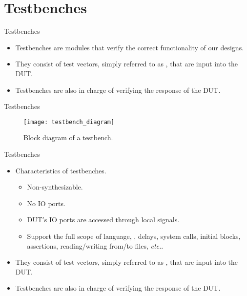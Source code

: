 \section{Testbenches}
%
\begin{frame}{Testbenches}{}
\begin{itemize}
\item Testbenches are  modules that verify the correct functionality of our designs.
\item They consist of test vectors, simply referred to as , that are input into the \ac{DUT}.
\item Testbenches are also in charge of verifying the response of the \ac{DUT}.
\end{itemize}
\end{frame}

%
\begin{frame}{Testbenches}{}
  \begin{figure}
    \centering
    \texttt{[image: testbench\_diagram]}
    \vspace{-2pt}
    \caption{Block diagram of a testbench.}
    \label{Figure:Testbench_diagram}
  \end{figure}
\end{frame}

%
\begin{frame}{Testbenches}{}
\begin{itemize}
\item Characteristics of testbenches.
\begin{itemize}
\item Non-synthesizable.
\item No \ac{IO} ports.
\item \ac{DUT}'s \ac{IO} ports are accessed through local signals.
\item Support the full scope of \SV language, \ie, delays, system calls, initial blocks, assertions, reading/writing from/to files, \emph{etc.}.
\end{itemize}
\item They consist of test vectors, simply referred to as , that are input into the \ac{DUT}.
\item Testbenches are also in charge of verifying the response of the \ac{DUT}.
\end{itemize}
\end{frame}

